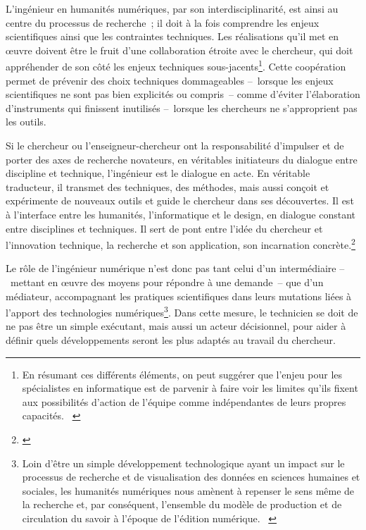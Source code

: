 \documentclass[a4paper,12pt,twoside]{book}
\let\quoteOld\quote
\let\endquoteOld\endquote
\renewenvironment{quote}{\small\quoteOld}{\endquoteOld}
\newcommand{\g}[1]{\og#1~\fg}
\begin{document}
L'ingénieur en humanités numériques, par son interdisciplinarité, est ainsi au centre du processus de recherche~; il doit à la fois comprendre les enjeux scientifiques ainsi que les contraintes techniques. Les réalisations qu'il met en œuvre doivent être le fruit d'une collaboration étroite avec le chercheur, qui doit appréhender de son côté les enjeux techniques sous-jacents\footnote{\g{En résumant ces différents éléments, on peut suggérer que l’enjeu pour les spécialistes en informatique est de parvenir à faire voir les limites qu’ils fixent aux possibilités d’action de l’équipe comme indépendantes de leurs propres capacités.} \cite[§~21]{oberhauserCollaborationsEquivoques2016}}. Cette coopération permet de prévenir des choix techniques dommageables –~lorsque les enjeux scientifiques ne sont pas bien explicités ou compris~– comme d'éviter l'élaboration d'instruments qui finissent inutilisés –~lorsque les chercheurs ne s'approprient pas les outils.

\begin{quote}
	Si le chercheur ou l’enseigneur-chercheur ont la responsabilité d’impulser et de porter des axes de recherche novateurs, en véritables initiateurs du dialogue entre discipline et technique, l’ingénieur est le dialogue en acte. En véritable traducteur, il transmet des techniques, des méthodes, mais aussi conçoit et expérimente de nouveaux outils et guide le chercheur dans ses découvertes. Il est à l’interface entre les humanités, l’informatique et le design, en dialogue constant entre disciplines et techniques. Il sert de pont entre l’idée du chercheur et l’innovation technique, la recherche et son application, son incarnation concrète.\footnote{\cite[p.~3]{massotDessinerActeursHumanites2018}}
\end{quote}

Le rôle de l'ingénieur numérique n'est donc pas tant celui d'un intermédiaire –~mettant en œuvre des moyens pour répondre à une demande~– que d'un médiateur, accompagnant les pratiques scientifiques dans leurs mutations liées à l'apport des technologies numériques\footnote{\g{Loin d’être un simple développement technologique ayant un impact sur le processus de recherche et de visualisation des données en sciences humaines et sociales, les humanités numériques nous amènent à repenser le sens même de la recherche et, par conséquent, l’ensemble du modèle de production et de circulation du savoir à l’époque de l’édition numérique.} \cite[§~3]{sinatraChapitreHistoireHumanites2014}}. Dans cette mesure, le technicien se doit de ne pas être un simple exécutant, mais aussi un acteur décisionnel, pour aider à définir quels développements seront les plus adaptés au travail du chercheur.
\end{document}
